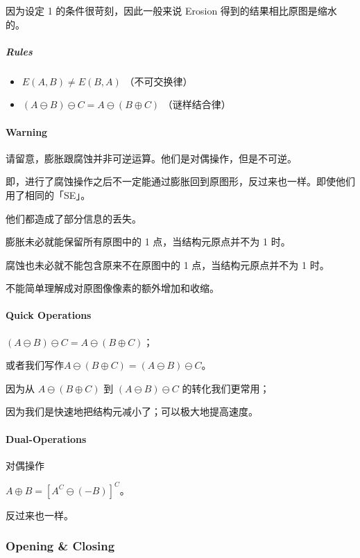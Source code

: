 \documentclass[
]{article}
\begin{document}
因为设定 1 的条件很苛刻，因此一般来说 Erosion
得到的结果相比原图是缩水的。

\hypertarget{header-n44}{%
\subparagraph{Rules}\label{header-n44}}

\begin{itemize}
\item
  \(E(A, B) ≠ E(B, A)\) （不可交换律）
\item
  \((A ⊖ B) ⊖ C = A ⊖ (B ⊕ C)\) （谜样结合律）
\end{itemize}

\hypertarget{header-n50}{%
\paragraph{Warning}\label{header-n50}}

请留意，膨胀跟腐蚀并非可逆运算。他们是对偶操作，但是不可逆。

即，进行了腐蚀操作之后不一定能通过膨胀回到原图形，反过来也一样。即使他们用了相同的「SE」。

他们都造成了部分信息的丢失。

膨胀未必就能保留所有原图中的 1 点，当结构元原点并不为 1 时。

腐蚀也未必就不能包含原来不在原图中的 1 点，当结构元原点并不为 1 时。

不能简单理解成对原图像像素的额外增加和收缩。

\hypertarget{header-n57}{%
\paragraph{Quick Operations}\label{header-n57}}

\((A ⊖ B) ⊖ C = A ⊖ (B ⊕ C)\)；

或者我们写作\(A ⊖ (B ⊕ C) = (A ⊖ B) ⊖ C\)。

因为从 \(A ⊖ (B ⊕ C)\) 到 \((A ⊖ B) ⊖ C\) 的转化我们更常用；

因为我们是快速地把结构元减小了；可以极大地提高速度。

\hypertarget{header-n62}{%
\paragraph{Dual-Operations}\label{header-n62}}

对偶操作

\(A ⊕ B = [A^C ⊖ (- B)]^C\)。

反过来也一样。

\hypertarget{header-n66}{%
\subsubsection{Opening \& Closing}\label{header-n66}}
\end{document}
